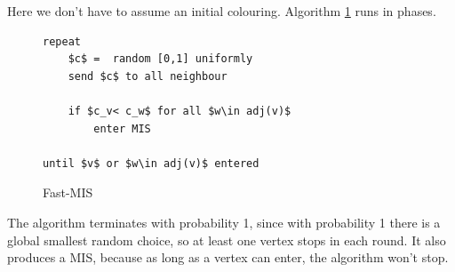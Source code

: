 Here we don't have to assume an initial colouring. Algorithm \ref{alg:fast_mis} runs in phases.

\begin{figure}
\begin{lstlisting}
repeat
	$c$ =  random [0,1] uniformly 
	send $c$ to all neighbour
	
	if $c_v< c_w$ for all $w\in adj(v)$ 
		enter MIS

until $v$ or $w\in adj(v)$ entered
\end{lstlisting}
\caption{Fast-MIS}
\label{alg:fast_mis}
\end{figure}

The algorithm terminates with probability 1, since with probability 1 there is a global smallest random choice, so at least one vertex stops in each round. It also produces a MIS, because as long as a vertex can enter, the algorithm won't stop.

